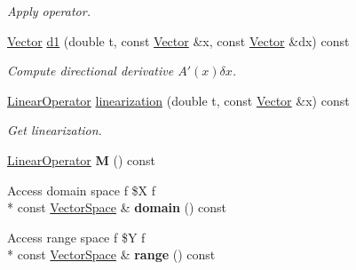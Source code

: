 \begin{DoxyCompactItemize}
\begin{DoxyCompactList}\small\item\em Apply operator. \end{DoxyCompactList}\item 
\hypertarget{classSpacy_1_1DynamicC1Operator_acac514b4a574321a0bf923f9b348e106}{\hyperlink{classSpacy_1_1Vector}{Vector} \hyperlink{classSpacy_1_1DynamicC1Operator_acac514b4a574321a0bf923f9b348e106}{d1} (double t, const \hyperlink{classSpacy_1_1Vector}{Vector} \&x, const \hyperlink{classSpacy_1_1Vector}{Vector} \&dx) const }\label{classSpacy_1_1DynamicC1Operator_acac514b4a574321a0bf923f9b348e106}

\begin{DoxyCompactList}\small\item\em Compute directional derivative $A'(x)\delta x$. \end{DoxyCompactList}\item 
\hypertarget{classSpacy_1_1DynamicC1Operator_a3beba5b0012422e11b9c989efe0e224b}{\hyperlink{classSpacy_1_1LinearOperator}{Linear\-Operator} \hyperlink{classSpacy_1_1DynamicC1Operator_a3beba5b0012422e11b9c989efe0e224b}{linearization} (double t, const \hyperlink{classSpacy_1_1Vector}{Vector} \&x) const }\label{classSpacy_1_1DynamicC1Operator_a3beba5b0012422e11b9c989efe0e224b}

\begin{DoxyCompactList}\small\item\em Get linearization. \end{DoxyCompactList}\item 
\hypertarget{classSpacy_1_1DynamicC1Operator_a8bef5bf8f2a8dd4e16ba39da1bda78d3}{\hyperlink{classSpacy_1_1LinearOperator}{Linear\-Operator} {\bfseries M} () const }\label{classSpacy_1_1DynamicC1Operator_a8bef5bf8f2a8dd4e16ba39da1bda78d3}

\item 
\hypertarget{classSpacy_1_1DynamicC1Operator_af2c63b9053e4f74acf0be073cdd59034}{Access domain space f \$X f \\*
const \hyperlink{classSpacy_1_1VectorSpace}{Vector\-Space} \& {\bfseries domain} () const }\label{classSpacy_1_1DynamicC1Operator_af2c63b9053e4f74acf0be073cdd59034}

\item 
\hypertarget{classSpacy_1_1DynamicC1Operator_adce157e1ed77bc3cfae969829316102b}{Access range space f \$Y f \\*
const \hyperlink{classSpacy_1_1VectorSpace}{Vector\-Space} \& {\bfseries range} () const }\label{classSpacy_1_1DynamicC1Operator_adce157e1ed77bc3cfae969829316102b}


\end{DoxyCompactItemize}
